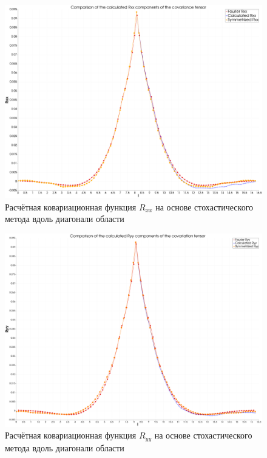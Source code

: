 \begin{figure}[ht] 
  \center
  \includegraphics [width=0.8\linewidth] {images/kriging/3components/diagonal_r11_x.png}
  \caption{Расчётная ковариационная функция $R_{xx}$ на основе стохастического метода вдоль диагонали области } 
  \label{img:kriging_covariances_diagonal_r11_x}  
\end{figure}

\begin{figure}[ht] 
  \center
  \includegraphics [width=0.8\linewidth] {images/kriging/3components/diagonal_r22_yy.png}
  \caption{Расчётная ковариационная функция $R_{yy}$ на основе стохастического метода вдоль диагонали области } 
  \label{img:kriging_covariances_diagonal_r22_yy}  
\end{figure}

